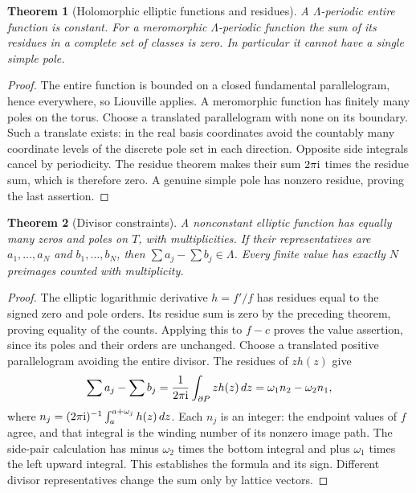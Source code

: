 \documentclass[11pt,a4paper,openany]{book}
\newtheorem{theorem}{Theorem}[chapter]
\theoremstyle{definition}
\theoremstyle{remark}\newtheorem{remark}[theorem]{Remark}
\newcommand{\family}[1]{}
\begin{document}
\begin{theorem}[Holomorphic elliptic functions and residues]\label{d12:22-02}\family{D12.22.02}
A $\Lambda$-periodic entire function is constant. For a meromorphic
$\Lambda$-periodic function the sum of its residues in a complete set
of classes is zero. In particular it cannot have a single simple pole.
\end{theorem}
\begin{proof}
The entire function is bounded on a closed fundamental parallelogram,
hence everywhere, so Liouville applies. A meromorphic function has
finitely many poles on the torus. Choose a translated parallelogram
with none on its boundary. Such a translate exists: in the real basis
coordinates avoid the countably many coordinate levels of the discrete
pole set in each direction. Opposite side integrals cancel by periodicity.
The residue theorem makes their sum $2\pi\mathrm i$ times the residue sum,
which is therefore zero. A genuine simple pole has nonzero residue,
proving the last assertion.
\end{proof}

\begin{theorem}[Divisor constraints]\label{d12:22-03}\family{D12.22.03}
A nonconstant elliptic function has equally many zeros and poles on
$T$, with multiplicities. If their representatives are $a_1,\ldots,a_N$
and $b_1,\ldots,b_N$, then
$\sum a_j-\sum b_j\in\Lambda$. Every finite value has exactly $N$
preimages counted with multiplicity.
\end{theorem}
\begin{proof}
The elliptic logarithmic derivative $h=f'/f$ has residues equal to the
signed zero and pole orders. Its residue sum is zero by the preceding
theorem, proving equality of the counts. Applying this to $f-c$ proves
the value assertion, since its poles and their orders are unchanged.
Choose a translated positive parallelogram avoiding the entire divisor.
The residues of $zh(z)$ give
\[
 \sum a_j-\sum b_j
 =\frac1{2\pi\mathrm i}\int_{\partial P}zh(z)\,dz
 =\omega_1 n_2-\omega_2 n_1,
\]
where $n_j=(2\pi\mathrm i)^{-1}\int_{a}^{a+\omega_j}h(z)\,dz$.
Each $n_j$ is an integer: the endpoint values of $f$ agree, and that
integral is the winding number of its nonzero image path. The side-pair
calculation has minus $\omega_2$ times the bottom integral and plus
$\omega_1$ times the left upward integral. This establishes the formula
and its sign. Different divisor representatives change the sum only
by lattice vectors.
\end{proof}
\end{document}
